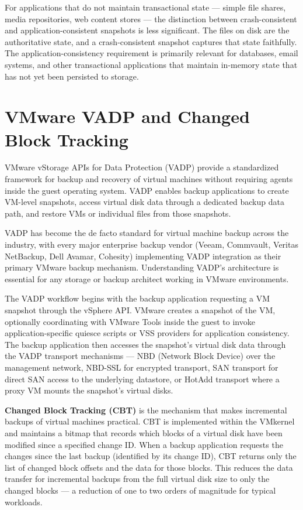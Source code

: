 For applications that do not maintain transactional state --- simple file shares, media repositories, web content stores --- the distinction between crash-consistent and application-consistent snapshots is less significant. The files on disk are the authoritative state, and a crash-consistent snapshot captures that state faithfully. The application-consistency requirement is primarily relevant for databases, email systems, and other transactional applications that maintain in-memory state that has not yet been persisted to storage.

\section{VMware VADP and Changed Block Tracking}

VMware vStorage APIs for Data Protection (VADP) provide a standardized framework for backup and recovery of virtual machines without requiring agents inside the guest operating system. VADP enables backup applications to create VM-level snapshots, access virtual disk data through a dedicated backup data path, and restore VMs or individual files from those snapshots.

VADP has become the de facto standard for virtual machine backup across the industry, with every major enterprise backup vendor (Veeam, Commvault, Veritas NetBackup, Dell Avamar, Cohesity) implementing VADP integration as their primary VMware backup mechanism. Understanding VADP's architecture is essential for any storage or backup architect working in VMware environments.

The VADP workflow begins with the backup application requesting a VM snapshot through the vSphere API. VMware creates a snapshot of the VM, optionally coordinating with VMware Tools inside the guest to invoke application-specific quiesce scripts or VSS providers for application consistency. The backup application then accesses the snapshot's virtual disk data through the VADP transport mechanisms --- NBD (Network Block Device) over the management network, NBD-SSL for encrypted transport, SAN transport for direct SAN access to the underlying datastore, or HotAdd transport where a proxy VM mounts the snapshot's virtual disks.

\textbf{Changed Block Tracking (CBT)} is the mechanism that makes incremental backups of virtual machines practical. CBT is implemented within the VMkernel and maintains a bitmap that records which blocks of a virtual disk have been modified since a specified change ID. When a backup application requests the changes since the last backup (identified by its change ID), CBT returns only the list of changed block offsets and the data for those blocks. This reduces the data transfer for incremental backups from the full virtual disk size to only the changed blocks --- a reduction of one to two orders of magnitude for typical workloads.

